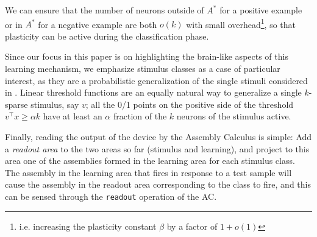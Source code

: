 \documentclass[final,12pt]{colt2022} %
\newcommand{\assmcore}[1]{{#1}^*}
\begin{document}
\begin{remark}
We can ensure that the number of neurons outside of $\assmcore{A}$ for a positive example or in $\assmcore{A}$ for a negative example are both $o(k)$ with small overhead\footnote{i.e. increasing the plasticity constant $\beta$ by a factor of $1 + o(1)$}, so that plasticity can be active during the classification phase. 
\end{remark}

Since our focus in this paper is on highlighting the brain-like aspects of this learning mechanism, we emphasize stimulus classes as a case of particular interest, as they are a probabilistic generalization of the single stimuli considered in \citet{papadimitriou2019random}. %
Linear threshold functions are an equally natural way to generalize a single $k$-sparse stimulus, say $v$; all the 0/1 points on the positive side of the threshold $v^\top x \ge \alpha k$ have at least an $\alpha$ fraction of the $k$ neurons of the stimulus active.


Finally, reading the output of the device by the Assembly Calculus is simple: Add a {\em readout area} to the two areas so far (stimulus and learning), and project to this area one of the assemblies formed in the learning area for each stimulus class.  The assembly in the learning area that fires in response to a test sample will cause the assembly in the readout area  corresponding to the class to fire, and this can be sensed through the {\tt readout} operation of the AC.
\end{document}
